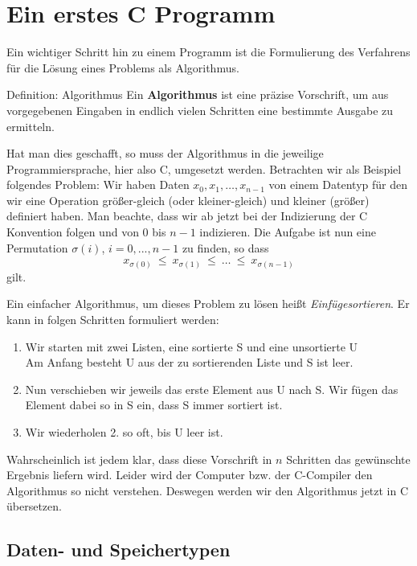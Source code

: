 \section{Ein erstes C Programm}

Ein wichtiger Schritt hin zu einem Programm ist die Formulierung des
Verfahrens für die Lösung eines Problems als Algorithmus.
\begin{myblock}{Definition: Algorithmus}
Ein \textbf{Algorithmus} ist eine präzise Vorschrift, um aus vorgegebenen
Eingaben in endlich vielen Schritten eine bestimmte Ausgabe zu
ermitteln.
\end{myblock}

Hat man dies geschafft, so muss der Algorithmus in die jeweilige Programmiersprache, hier also C, umgesetzt werden.
Betrachten wir als Beispiel folgendes Problem:
Wir haben Daten $x_0, x_1,\ldots,x_{n-1}$ von einem Datentyp für den wir eine Operation größer-gleich (oder kleiner-gleich) und kleiner (größer) definiert haben.
Man beachte, dass wir ab jetzt bei der Indizierung der C Konvention folgen und von $0$ bis $n-1$ indizieren.
Die Aufgabe ist nun eine Permutation $\sigma(i)$, $i=0,...,n-1$ zu finden, so dass
\[
x_{\sigma(0)}\ \leq\ x_{\sigma(1)}\ \leq\ \ldots\ \leq\ x_{\sigma(n-1)}
\]
gilt.

Ein einfacher Algorithmus, um dieses Problem zu lösen heißt \emph{Einfügesortieren}.
Er kann in folgen Schritten formuliert werden:
\begin{enumerate}
\item Wir starten mit zwei Listen, eine sortierte S und eine unsortierte U\\
  Am Anfang besteht U aus der zu sortierenden Liste und S ist leer.
\item Nun verschieben wir jeweils das erste Element aus U nach S.
  Wir fügen das Element dabei so in S ein, dass S immer sortiert ist.
 \item Wir wiederholen 2. so oft, bis U leer ist.
\end{enumerate}
Wahrscheinlich ist jedem klar, dass diese Vorschrift in $n$ Schritten das gewünschte Ergebnis liefern wird.
Leider wird der Computer bzw. der C-Compiler den Algorithmus so nicht verstehen.
Deswegen werden wir den Algorithmus jetzt in C übersetzen.

\subsection{Daten- und Speichertypen}

